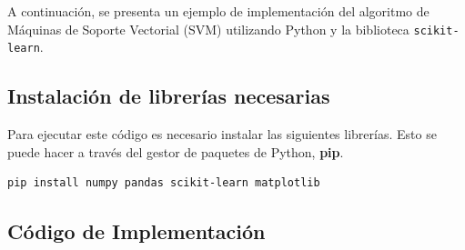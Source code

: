\documentclass[a4paper,12pt]{article}
\begin{document}
A continuación, se presenta un ejemplo de implementación del algoritmo de Máquinas de Soporte Vectorial (SVM) utilizando Python y la biblioteca \texttt{scikit-learn}.

\subsection{Instalación de librerías necesarias}

Para ejecutar este código es necesario instalar las siguientes librerías. Esto se puede hacer a través del gestor de paquetes de Python, \textbf{pip}.

\begin{verbatim}
pip install numpy pandas scikit-learn matplotlib
\end{verbatim}

\subsection{Código de Implementación}
\end{document}
